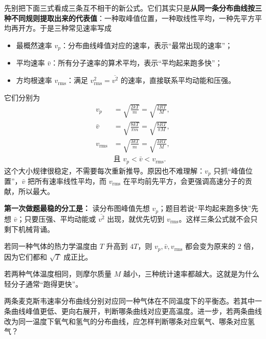 \documentclass[lang=cn,11pt]{elegantbook}
\begin{document}
先别把下面三式看成三条互不相干的新公式。它们其实只是\textbf{从同一条分布曲线按三种不同规则提取出来的代表值}：一种取峰值位置，一种取线性平均，一种先平方平均再开方。于是三种常见速率写成
\begin{itemize}
 \item 最概然速率 \(v_p\)：分布曲线峰值对应的速率，表示“最常出现的速率”；
 \item 平均速率 \(\bar v\)：所有分子速率的算术平均，表示“平均起来跑多快”；
 \item 方均根速率 \(v_{\mathrm{rms}}\)：满足 \(v_{\mathrm{rms}}^2=\overline{v^2}\) 的速率，直接联系平均动能和压强。
\end{itemize}

它们分别为
\[
\begin{aligned}
v_p&=\sqrt{\frac{2kT}{m}}=\sqrt{\frac{2RT}{M}},\\
\bar v&=\sqrt{\frac{8kT}{\pi m}}=\sqrt{\frac{8RT}{\pi M}},\\
v_{\mathrm{rms}}&=\sqrt{\frac{3kT}{m}}=\sqrt{\frac{3RT}{M}},\\
&\text{且 }v_p<\bar v<v_{\mathrm{rms}}.
\end{aligned}
\]
这个大小规律很稳定，不需要每次重新推导。原因也不难理解：\(v_p\) 只抓“峰值位置”，\(\bar v\) 把所有速率线性平均，而 \(v_{\mathrm{rms}}\) 在平均前先平方，会更强调高速分子的贡献，所以最大。

\begin{note}
\textbf{第一次做题最稳的分工是：} 读分布图峰值先想 \(v_p\)；题目若说“平均起来跑多快”先想 \(\bar v\)；只要压强、平均动能或 \(\overline{v^2}\) 出现，就优先切到 \(v_{\mathrm{rms}}\)。这样三条公式就不会只剩下机械背诵。
\end{note}

\begin{exercise}[怎样快速判断三种统计速率的变化]
若同一种气体的热力学温度由 \(T\) 升高到 \(4T\)，则 \(v_p,\bar v,v_{\mathrm{rms}}\) 都会变为原来的 \(2\) 倍，因为它们都和 \(\sqrt{T}\) 成正比。

若两种气体温度相同，则摩尔质量 \(M\) 越小，三种统计速率都越大。这就是为什么轻分子通常“跑得更快”。
\end{exercise}

\begin{exercise}[只看分布曲线时怎样先判温度和分子种类]
两条麦克斯韦速率分布曲线分别对应同一种气体在不同温度下的平衡态。若其中一条曲线峰值更低、更向右展开，判断哪条曲线对应更高温度。进一步，若两条曲线改为同一温度下氧气和氢气的分布曲线，应怎样判断哪条对应氧气、哪条对应氢气？
\end{exercise}
\end{document}
